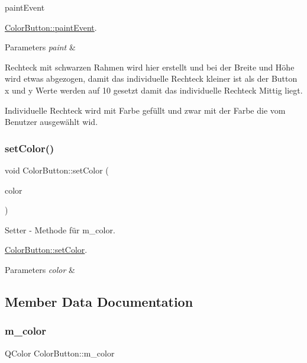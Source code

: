 paint\+Event 

\hyperlink{class_color_button_ae7b2847c9974fb52f80d54dafc7a0f00}{Color\+Button\+::paint\+Event}.


\begin{DoxyParams}{Parameters}
{\em paint} & \\
\hline
\end{DoxyParams}
Rechteck mit schwarzen Rahmen wird hier erstellt und bei der Breite und Höhe wird etwas abgezogen, damit das individuelle Rechteck kleiner ist als der Button x und y Werte werden auf 10 gesetzt damit das individuelle Rechteck Mittig liegt.

Individuelle Rechteck wird mit Farbe gefüllt und zwar mit der Farbe die vom Benutzer ausgewählt wid.\mbox{\label{class_color_button_ad0d3747c9ceb3ed57d3f513f42fd4cf2}} 
\subsubsection{\texorpdfstring{set\+Color()}{setColor()}}
{\footnotesize\ttfamily void Color\+Button\+::set\+Color (\begin{DoxyParamCaption}\item[{const Q\+Color \&}]{color }\end{DoxyParamCaption})}



Setter -\/ Methode für m\+\_\+color. 

\hyperlink{class_color_button_ad0d3747c9ceb3ed57d3f513f42fd4cf2}{Color\+Button\+::set\+Color}.


\begin{DoxyParams}{Parameters}
{\em color} & \\
\hline
\end{DoxyParams}


\subsection{Member Data Documentation}
\mbox{\label{class_color_button_aa4408cd251575659e5e8417802f276e4}} 
\subsubsection{\texorpdfstring{m\+\_\+color}{m\_color}}
{\footnotesize\ttfamily Q\+Color Color\+Button\+::m\+\_\+color\hspace{0.3cm}{\ttfamily [protected]}}



